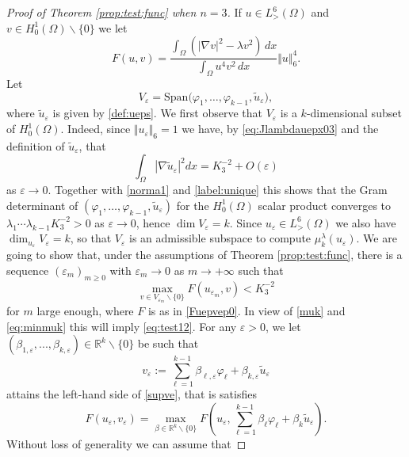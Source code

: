 \documentclass[10pt]{amsart}
\numberwithin{equation}{section}
\newcommand{\ve}{\varepsilon}
\newcommand{\vp}{\varphi}
\newcommand{\Om}{\Omega}
\def \rr {\mathbb{R}}
\theoremstyle{plain}
\theoremstyle{remark}
\begin{document}
\begin{proof}[Proof of Theorem \ref{prop:test:func} when $n=3$]

 If $u \in L^{6}_{>}(\Om)$ and $v \in H^1_0(\Om)\backslash \{0\}$ we let 
 \begin{equation}\label{Fuepvep0}
 	F(u,v)=\frac{\int_{\Om}\left( |\nabla v|^2 - \lambda v^2 \right) \, dx}{\int_{\Om} u^{4} v^2 \, dx} \Vert u \Vert_{6}^{4}.
 \end{equation} 
 Let 
$$ V_\ve = \text{Span} \big( \vp_{1}, \dots, \vp_{k-1}, \tilde{u}_\ve\big), $$
where $\tilde{u}_\ve$ is given by \eqref{def:ueps}. We first observe that $V_\ve$ is a $k$-dimensional subset of $H^1_0(\Om)$. Indeed, since $\Vert u_\ve \Vert_{6} = 1$ we have, by \eqref{eq:Jlambdauepx03} and the definition of $\tilde{u}_\ve$, that
\begin{equation*} 
 \int_{\Om} |\nabla \tilde{u} _\ve|^2 dx = K_3^{-2} + O(\ve) 
 \end{equation*}
as $\ve \to 0$. Together with \eqref{norma1} and \eqref{label:unique} this shows that the Gram determinant of $( \vp_{1}, \dots, \vp_{k-1}, \tilde{u}_\ve)$ for the $H^1_0(\Om)$ scalar product converges to $ \lambda_1 \cdots \lambda_{k-1} K_3^{-2} >0 $ as $\ve \to 0$, hence $\dim V_\ve = k$. Since $u_\ve \in L^{6}_{>}(\Om)$ we also have $\dim_{u_\ve} V_\ve = k$, so that $V_\ve$ is an admissible subspace to compute $\mu_k^{\lambda}(u_\ve)$. We are going to show that, under the assumptions of Theorem \ref{prop:test:func}, there is a sequence $(\ve_m)_{m \ge 0}$ with $\ve_m \to 0$ as $m \to + \infty$ such that 
\begin{equation} \label{supve}
 \max_{ v \in V_{\ve_m} \backslash \{0\} } F(u_{\ve_m},v) < K_3^{-2}
  \end{equation}
for $m$ large enough, where $F$ is as in \eqref{Fuepvep0}. In view of \eqref{muk} and \eqref{eq:minmuk} this will imply \eqref{eq:test12}. For any $\ve>0$, we let $(\beta_{1,\ve},...,\beta_{k,\ve})\in \rr^k\backslash\{0\}$ be such that
 \begin{equation}\label{defve}
 	v_\ve:=\sum_{\ell=1}^{k-1}\beta_{\ell,\ve} \varphi_{\ell}+\beta_{k,\ve}\tilde{u}_{\ve}
 \end{equation}
attains the left-hand side of \eqref{supve}, that is satisfies 
 \begin{equation*} 
 	F(u_{\ve},v_{\ve})=\max_{\beta\in \rr^{k}\backslash\{0\}}F\left( u_{\ve},\sum_{\ell=1}^{k-1}\beta_{\ell} \varphi_{\ell}+\beta_{k}\tilde{u}_{\ve}\right).
 \end{equation*}
 Without loss of generality we can assume that

\end{proof}
\end{document}
